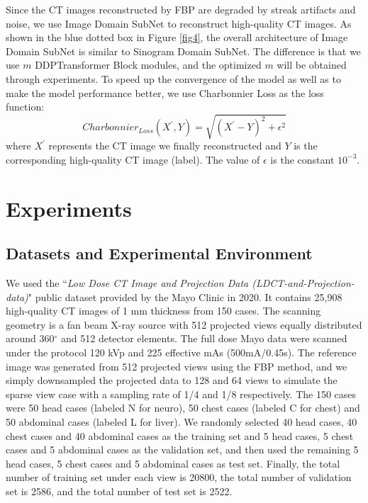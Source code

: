 \documentclass[lettersize,journal]{IEEEtran}
\begin{document}
Since the CT images reconstructed by FBP are degraded by streak artifacts and noise, we use Image Domain SubNet to reconstruct high-quality CT images. As shown in the blue dotted box in Figure \ref{fig4}, the overall architecture of Image Domain SubNet is similar to Sinogram Domain SubNet. The difference is that we use $m$ DDPTransformer Block modules, and the optimized $m$ will be obtained through experiments. To speed up the convergence of the model as well as to make the model performance better, we use Charbonnier Loss\cite{2017Fast} as the loss function:
\begin{equation}
Charbonnier_{Loss}(X^{'}, Y) = \sqrt{(X^{'}-Y)^{2} + \epsilon^{2}}
\end{equation}
where $X^{'}$ represents the CT image we finally reconstructed and $Y$ is the corresponding high-quality CT image (label). The value of $\epsilon$ is the constant $10^{-3}$.


\section{Experiments}
\subsection{Datasets and Experimental Environment}

We used the ``\emph{Low Dose CT Image and Projection Data (LDCT-and-Projection-data)}"\cite{moen2021low} public dataset provided by the Mayo Clinic in 2020. It contains 25,908 high-quality CT images of 1 mm thickness from 150 cases. The scanning geometry is a fan beam X-ray source with 512 projected views equally distributed around 360$^{\circ}$ and 512 detector elements. The full dose Mayo data were scanned under the protocol 120 kVp and 225 effective mAs (500mA/0.45s). The reference image was generated from 512 projected views using the FBP method, and we simply downsampled the projected data to 128 and 64 views to simulate the sparse view case with a sampling rate of 1/4 and 1/8 respectively. The 150 cases were 50 head cases (labeled N for neuro), 50 chest cases (labeled C for chest) and 50 abdominal cases (labeled L for liver). We randomly selected 40 head cases, 40 chest cases and 40 abdominal cases as the training set and 5 head cases, 5 chest cases and 5 abdominal cases as the validation set, and then used the remaining 5 head cases, 5 chest cases and 5 abdominal cases as test set. Finally, the total number of training set under each view is 20800, the total number of validation set is 2586, and the total number of test set is 2522.
\end{document}
